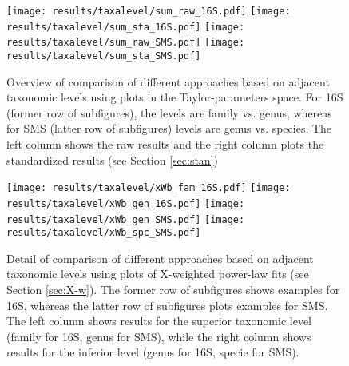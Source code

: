 \documentclass[12pt]{article}
\begin{document}
\begin{figure} 
  \texttt{[image: results/taxalevel/sum\_raw\_16S.pdf]}
  \texttt{[image: results/taxalevel/sum\_sta\_16S.pdf]}
  \texttt{[image: results/taxalevel/sum\_raw\_SMS.pdf]} 
  \texttt{[image: results/taxalevel/sum\_sta\_SMS.pdf]}
\caption{Overview of comparison of different approaches based on adjacent taxonomic levels using plots in the Taylor-parameters space. For 16S (former row of subfigures), the levels are family vs. genus, whereas for SMS (latter row of subfigures) levels are genus vs. species. The left column shows the raw results and the right column plots the standardized results (see Section \ref{sec:stan})}
\label{fig:taxlev1}
\end{figure}

\begin{figure} 
  \texttt{[image: results/taxalevel/xWb\_fam\_16S.pdf]}
  \texttt{[image: results/taxalevel/xWb\_gen\_16S.pdf]}
  \texttt{[image: results/taxalevel/xWb\_gen\_SMS.pdf]}
  \texttt{[image: results/taxalevel/xWb\_spc\_SMS.pdf]}
\caption{Detail of comparison of different approaches based on adjacent taxonomic levels using plots of X-weighted power-law fits (see Section \ref{sec:X-w}). The former row of subfigures shows examples for 16S, whereas the latter row of subfigures plots examples for SMS. The left column shows results for the superior taxonomic level (family for 16S, genus for SMS), while the right column shows results for the inferior level (genus for 16S, specie for SMS).}
\label{fig:taxlev2}
\end{figure}
\end{document}
